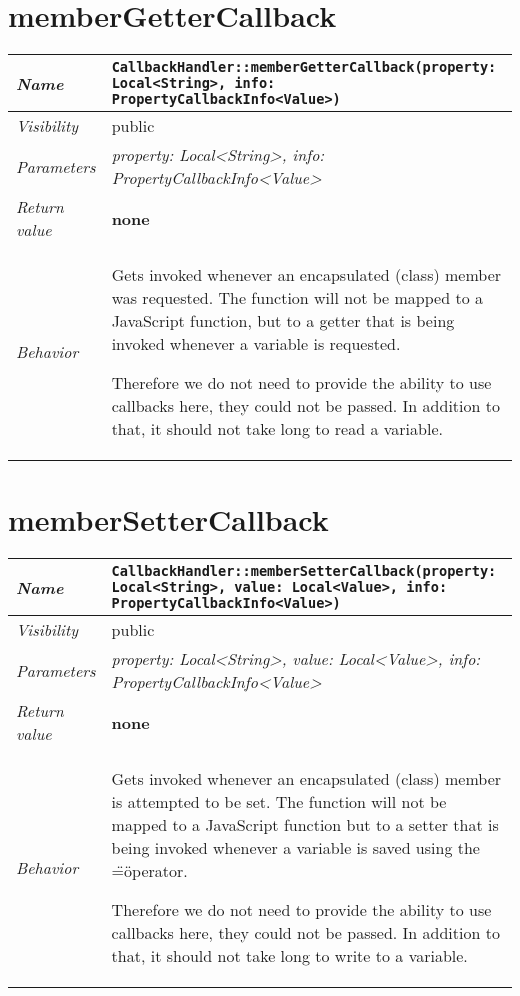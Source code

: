 \section{memberGetterCallback}
\begin{longtable}{p{3cm} @{\hskip 1cm} p{12cm}}
 \hline
\textit{Name} & \texttt{CallbackHandler::memberGetterCallback(property: Local<String>, info: PropertyCallbackInfo<Value>)}\\
\hline
 \textit{Visibility} & public\\
\hline
\textit{Parameters} & \textit{property: Local<String>, info: PropertyCallbackInfo<Value>}\\
\hline
\textit{Return value} & \textbf{none}\\
  \hline
 \textit{Behavior} & Gets invoked whenever an encapsulated (class) member was requested. The function will not be mapped to a JavaScript function, but to a getter that is being invoked whenever a variable is requested.

 Therefore we do not need to provide the ability to use callbacks here, they could not be passed. In addition to that, it should not take long to read a variable. \\
\hline
\end{longtable}
 \section{memberSetterCallback}
\begin{longtable}{p{3cm} @{\hskip 1cm} p{12cm}}
 \hline
\textit{Name} & \texttt{CallbackHandler::memberSetterCallback(property: Local<String>, value: Local<Value>, info: PropertyCallbackInfo<Value>)}\\
\hline
 \textit{Visibility} & public\\
\hline
\textit{Parameters} & \textit{property: Local<String>, value: Local<Value>, info: PropertyCallbackInfo<Value>}\\
\hline
\textit{Return value} & \textbf{none}\\
  \hline
 \textit{Behavior} & Gets invoked whenever an encapsulated (class) member is attempted to be set. The function will not be mapped to a JavaScript function but to a setter that is being invoked whenever a variable is saved using the \"=\" operator.

 Therefore we do not need to provide the ability to use callbacks here, they could not be passed. In addition to that, it should not take long to write to a variable. \\
\hline
\end{longtable}
